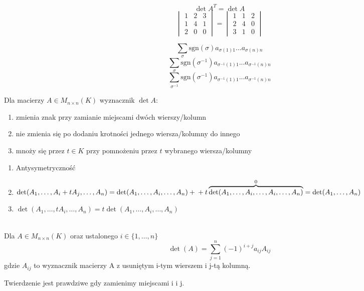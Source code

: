 \begin{ft}
    \[\det A^T = \det A\]
  \[\begin{vmatrix}1&2&3\\1&4&1\\2&0&0\end{vmatrix}
    =\begin{vmatrix}1&1&2\\2&4&0\\3&1&0\end{vmatrix}\]
\end{ft}
\begin{dd}
    \[\sum_\sigma\mathrm{sgn}(\sigma)a_{\sigma(1)1}...a_{\sigma(n)n}\]
    \[\sum_\sigma\mathrm{sgn}(\sigma^{-1})a_{\sigma^{-1}(1)1}...a_{\sigma^{-1}(n)n}\]
    \[\sum_{\sigma^{-1}}\mathrm{sgn}(\sigma^{-1})a_{\sigma^{-1}(1)1}...a_{\sigma^{-1}(n)n}\]
\end{dd}

\begin{wn}
    Dla macierzy $A \in M_{n \times n}(K)$ wyznacznik $\det A$:
    \begin{enumerate}[{(}1{)}]
        \item zmienia znak przy zamianie miejscami dwóch wierszy/kolumn
        \item nie zmienia się po dodaniu krotności jednego wiersza/kolumny do innego
        \item mnoży się przez $t \in K$ przy pomnożeniu przez $t$ wybranego
          wiersza/kolumny
    \end{enumerate}
\end{wn}

\begin{dd} \hfill
    \begin{enumerate}[{(}1{)}]
        \item Antysymetryczność
        \item $\det(A_1,\dots,A_i+tA_j,\dots,A_n) = \det(A_1,\dots,A_i,\dots,A_n) + \\ + t \overbrace{\det(A_1,\dots,A_i,\dots,A_i
        ,\dots,A_n)}^0 = \det(A_1,\dots,A_n)$
        \item $\det(A_1,\dots,tA_i,\dots,A_n) = t \det(A_1,\dots,A_i,\dots,A_n)$
    \end{enumerate}
\end{dd}

\begin{tw} ~\\
    Dla $A \in M_{n \times n} (K) $ oraz ustalonego $i \in \{1,\dots,n\}$ 
        $$\det(A) = \sum_{j=1}^n (-1)^{i+j} a_{ij} A_{ij}$$
        gdzie $A_{ij}$ to wyznacznik macierzy A z usuniętym i-tym wierszem i j-tą kolumną. 
        \end{tw}
\begin{uw}
    Twierdzenie jest prawdziwe gdy zamienimy miejscami i i j.
\end{uw}

